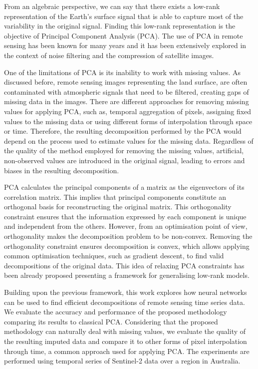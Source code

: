 \documentclass[essd, manuscript]{copernicus}
\begin{document}
From an algebraic perspective, we can say that there exists a low-rank representation of the Earth's surface signal that is able to capture most of the variability in the original signal. Finding this low-rank representation is the objective of Principal Component Analysis (PCA). The use of PCA in remote sensing has been known for many years and it has been extensively explored in the context of noise filtering and the compression of satellite images.

One of the limitations of PCA is its inability to work with missing values. As discussed before, remote sensing images representing the land surface, are often contaminated with atmospheric signals that need to be filtered, creating gaps of missing data in the images. There are different approaches for removing missing values for applying PCA, such as, temporal aggregation of pixels, assigning fixed values to the missing data or using different forms of interpolation through space or time. Therefore, the resulting decomposition performed by the PCA would depend on the process used to estimate values for the missing data. Regardless of the quality of the method employed for removing the missing values, artificial, non-observed values are introduced in the original signal, leading to errors and biases in the resulting decomposition.

PCA calculates the principal components of a matrix as the eigenvectors of its correlation matrix. This implies that principal components constitute an orthogonal basis for reconstructing the original matrix. This orthogonality constraint ensures that the information expressed by each component is unique and independent from the others. However, from an optimisation point of view, orthogonality makes the decomposition problem to be non-convex. Removing the orthogonality constraint ensures decomposition is convex, which allows applying common optimisation techniques, such as gradient descent, to find valid decompositions of the original data. This idea of relaxing PCA constraints has been already proposed \citep{udell2014generalized} presenting a framework for generalising low-rank models.

Building upon the previous framework, this work explores how neural networks can be used to find efficient decompositions of remote sensing time series data. We evaluate the accuracy and performance of the proposed methodology comparing its results to classical PCA. Considering that the proposed methodology can naturally deal with missing values, we evaluate the quality of the resulting imputed data and compare it to other forms of pixel interpolation through time, a common approach used for applying PCA. The experiments are performed using temporal series of Sentinel-2 data over a region in Australia.
\end{document}
